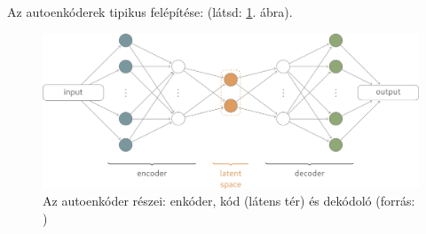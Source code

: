 Az autoenkóderek tipikus felépítése: (látsd: \ref{fig:autoenc_struct}. ábra).


  


\begin{figure}[ht]
	\centering
	\includegraphics[width=1\columnwidth]{figures/ae.png}
	\caption{Az autoenkóder részei: enkóder, kód (látens tér) és dekódoló (forrás: \cite{fig:autoenc_struct})}
	\label{fig:autoenc_struct}
\end{figure}

